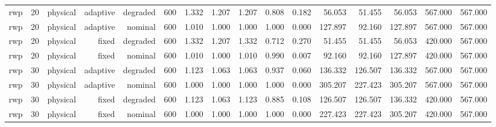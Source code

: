\begin{tabular}{lrrrrrrrrrrrrrrr}
rwp & 20 & physical & adaptive & degraded & 600 & 1.332 & 1.207 & 1.207 & 0.808 & 0.182 & 56.053 & 51.455 & 56.053 & 567.000 & 567.000 \\
rwp & 20 & physical & adaptive & nominal & 600 & 1.010 & 1.000 & 1.000 & 1.000 & 0.000 & 127.897 & 92.160 & 127.897 & 567.000 & 567.000 \\
rwp & 20 & physical & fixed & degraded & 600 & 1.332 & 1.207 & 1.332 & 0.712 & 0.270 & 51.455 & 51.455 & 56.053 & 420.000 & 567.000 \\
rwp & 20 & physical & fixed & nominal & 600 & 1.010 & 1.000 & 1.010 & 0.990 & 0.007 & 92.160 & 92.160 & 127.897 & 420.000 & 567.000 \\
rwp & 30 & physical & adaptive & degraded & 600 & 1.123 & 1.063 & 1.063 & 0.937 & 0.060 & 136.332 & 126.507 & 136.332 & 567.000 & 567.000 \\
rwp & 30 & physical & adaptive & nominal & 600 & 1.000 & 1.000 & 1.000 & 1.000 & 0.000 & 305.207 & 227.423 & 305.207 & 567.000 & 567.000 \\
rwp & 30 & physical & fixed & degraded & 600 & 1.123 & 1.063 & 1.123 & 0.885 & 0.108 & 126.507 & 126.507 & 136.332 & 420.000 & 567.000 \\
rwp & 30 & physical & fixed & nominal & 600 & 1.000 & 1.000 & 1.000 & 1.000 & 0.000 & 227.423 & 227.423 & 305.207 & 420.000 & 567.000 \\
\bottomrule
\end{tabular}